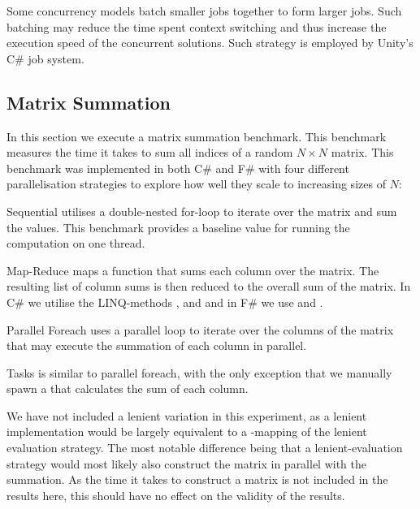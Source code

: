 Some concurrency models batch smaller jobs together to form larger jobs. Such batching may reduce the time spent context switching and thus increase the execution speed of the concurrent solutions. Such strategy is employed by Unity's C\# job system\cite{unity:csharp:job:system}.

\subsection{Matrix Summation}
In this section we execute a matrix summation benchmark. This benchmark measures the time it takes to sum all indices of a random $N \times N$ matrix. This benchmark was implemented in both C\# and F\# with four different parallelisation strategies to explore how well they scale to increasing sizes of $N$:

\begin{labeling}{\quad\quad}
    \item[Sequential] utilises a double-nested for-loop to iterate over the matrix and sum the values. This benchmark provides a baseline value for running the computation on one thread.
    \item[Map-Reduce] maps a function that sums each column over the matrix. The resulting list of column sums is then reduced to the overall sum of the matrix. In C\# we utilise the \gls{LINQ}-methods ,  and  and in F\# we use  and .
    \item[Parallel Foreach] uses a parallel loop to iterate over the columns of the matrix that may execute the summation of each column in parallel.
    \item[Tasks] is similar to parallel foreach, with the only exception that we manually spawn a  that calculates the sum of each column.
\end{labeling}

We have not included a lenient variation in this experiment, as a lenient implementation would be largely equivalent to a -mapping of the lenient evaluation strategy. The most notable difference being that a lenient-evaluation strategy would most likely also construct the matrix in parallel with the summation. As the time it takes to construct a matrix is not included in the results here, this should have no effect on the validity of the results.

